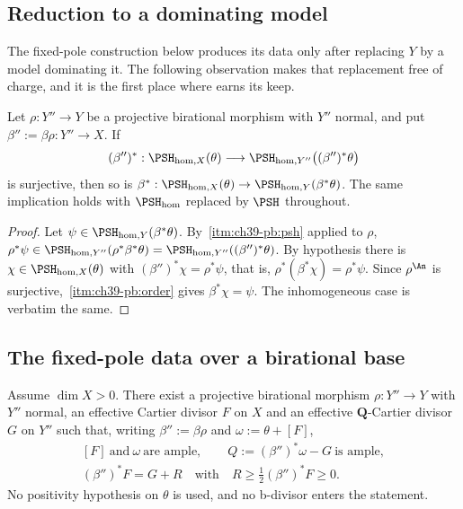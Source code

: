 \subsection{Reduction to a dominating model}
\label{sec:ch39-model-replacement}

The fixed-pole construction below produces its data only after replacing
$Y$ by a model dominating it.  The following observation makes that
replacement free of charge, and it is the first place where
 earns its keep.

\begin{lemma}
\label{lem:ch39-model-replacement}
Let $\rho:Y''\to Y$ be a projective birational morphism with $Y''$
normal, and put $\beta'':=\beta\rho:Y''\to X$.  If
\[
 (\beta'')^*:\PSH_{\mathrm{hom},X}(\theta)
 \longrightarrow\PSH_{\mathrm{hom},Y''}\bigl((\beta'')^*\theta\bigr)
\]
is surjective, then so is
$\beta^*:\PSH_{\mathrm{hom},X}(\theta)\to
\PSH_{\mathrm{hom},Y}(\beta^*\theta)$.  The same implication holds with
$\PSH_{\mathrm{hom}}$ replaced by $\PSH$ throughout.
\end{lemma}

\begin{proof}
Let $\psi\in\PSH_{\mathrm{hom},Y}(\beta^*\theta)$.  By
\,\cref{itm:ch39-pb:psh} applied to $\rho$,
$\rho^*\psi\in\PSH_{\mathrm{hom},Y''}(\rho^*\beta^*\theta)
=\PSH_{\mathrm{hom},Y''}((\beta'')^*\theta)$.  By hypothesis there is
$\chi\in\PSH_{\mathrm{hom},X}(\theta)$ with
$(\beta'')^*\chi=\rho^*\psi$, that is,
$\rho^*(\beta^*\chi)=\rho^*\psi$.  Since $\rho^{\An}$ is surjective,
\,\cref{itm:ch39-pb:order} gives
$\beta^*\chi=\psi$.  The inhomogeneous case is verbatim the same.
\end{proof}

\subsection{The fixed-pole data over a birational base}
\label{sec:ch39-fixed-pole}

\begin{lemma}
\label{lem:ch39-fixed-pole}
Assume $\dim X>0$.  There exist a projective birational morphism
$\rho:Y''\to Y$ with $Y''$ normal, an effective Cartier divisor $F$ on
$X$ and an effective $\mathbf Q$-Cartier divisor $G$ on $Y''$ such
that, writing $\beta'':=\beta\rho$ and $\omega:=\theta+[F]$,
\[
 \begin{gathered}
 [F]\ \text{and}\ \omega\ \text{are ample},
 \qquad
 Q:=(\beta'')^*\omega-G\ \text{is ample},\\
 (\beta'')^*F=G+R
 \quad\text{with}\quad
 R\ge\tfrac12(\beta'')^*F\ge0 .
 \end{gathered}
\tag{39.7}\label{eq:bj-reflection-fixed-pole}
\]
No positivity hypothesis on $\theta$ is used, and no b-divisor enters the
statement.
\end{lemma}

